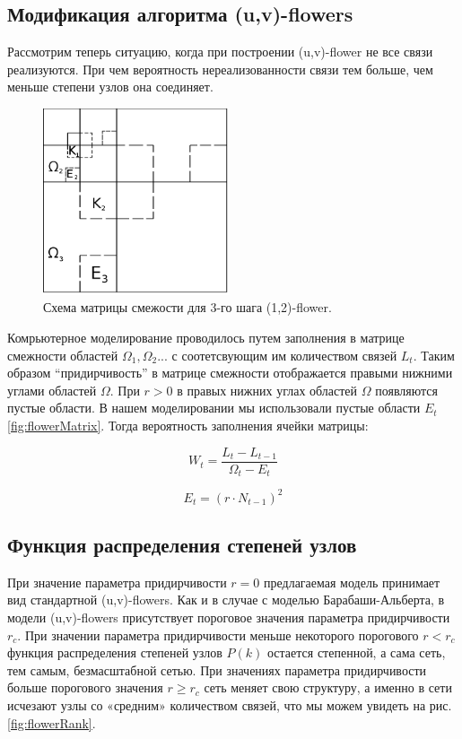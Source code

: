 \documentclass[10pt,aps,pra]{revtex4-1}
\begin{document}
\subsection{Модификация алгоритма (u,v)-flowers}

Рассмотрим теперь ситуацию, когда при построении (u,v)-flower не все связи реализуются. При чем вероятность нереализованности связи тем больше, чем меньше степени узлов она соединяет.

\begin{figure}[H]
\label{fig:flowerMatrixExceptive}
\centering
\includegraphics[height=5.5cm]{graphics/third_n.png}
\caption{Схема матрицы смежости для 3-го шага (1,2)-flower.}
\end{figure}

Комрьютерное моделирование проводилось путем заполнения в матрице смежности областей $\Omega_1, \Omega_2...$ с соотетсвующим им количеством связей $L_t$. Таким образом ``придирчивость'' в матрице смежности отображается правыми нижними углами областей $\Omega$. При $r>0$ в правых нижних углах областей $\Omega$ появляются пустые области. В нашем моделировании мы использовали пустые области $E_t$ \ref{fig:flowerMatrix}. Тогда вероятность заполнения ячейки матрицы:

\begin{equation}
W_t=\frac{L_t-L_{t-1}}{\Omega_t-E_t}
\end{equation}

\begin{equation}
E_t= (r \cdot N_{t-1})^2
\end{equation}

\subsection{Функция распределения степеней узлов}

При значение параметра придирчивости $r=0$ предлагаемая модель принимает вид стандартной (u,v)-flowers. Как и в случае с моделью Барабаши-Альберта, в модели (u,v)-flowers присутствует пороговое значения параметра придирчивости $r_c$. При значении параметра придирчивости меньше некоторого порогового $r<r_c$ функция распределения степеней узлов $P(k)$ остается степенной, а сама сеть, тем самым, безмасштабной сетью. При значениях параметра придирчивости больше порогового значения $r \geq r_c$ сеть меняет свою структуру, а именно в сети исчезают узлы со «средним» количеством связей, что мы можем увидеть на рис. \ref{fig:flowerRank}. 
\end{document}
